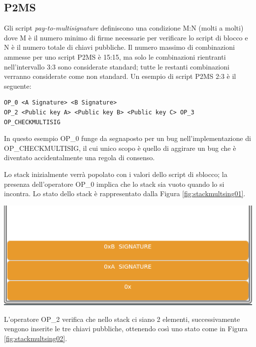 \subsection{P2MS}
\label{sec:p2msbitcoin}
Gli script {\it pay-to-multisignature} definiscono una condizione M:N (molti a molti) dove M è il numero minimo di firme necessarie per verificare lo script di blocco e N è il numero totale di chiavi pubbliche.
Il numero massimo di combinazioni ammesse per uno script P2MS è 15:15, ma solo le combinazioni rientranti nell’intervallo 3:3 sono considerate standard; tutte le restanti combinazioni verranno considerate come non standard.
Un esempio di script P2MS 2:3 è il seguente:

\begin{lstlisting}[language=bitcoinscript, caption={Script P2MS completo.}]
OP_0 <A Signature> <B Signature>
OP_2 <Public key A> <Public key B> <Public key C> OP_3 OP_CHECKMULTISIG
\end{lstlisting}
In questo esempio OP\_0 funge da segnaposto per un bug nell’implementazione di OP\_CHE\-CK\-MULTI\-SIG, il cui unico scopo è quello di aggirare un bug che è diventato accidentalmente una regola di consenso.

Lo stack inizialmente verrà popolato con i valori dello script di sblocco; la presenza dell’operatore OP\_0 implica che lo stack sia vuoto quando lo si incontra. Lo stato dello stack è rappresentato dalla Figura \ref{fig:stackmultsing01}.

{\centering
\vspace{15pt}
\includegraphics[scale=0.35]{images/script/multisig/1.png}
\vspace{10pt}
\par}

L’operatore OP\_2 verifica che nello stack ci siano 2 elementi, successivamente vengono inserite le tre chiavi pubbliche, ottenendo così uno stato come in Figura \ref{fig:stackmultsing02}.

